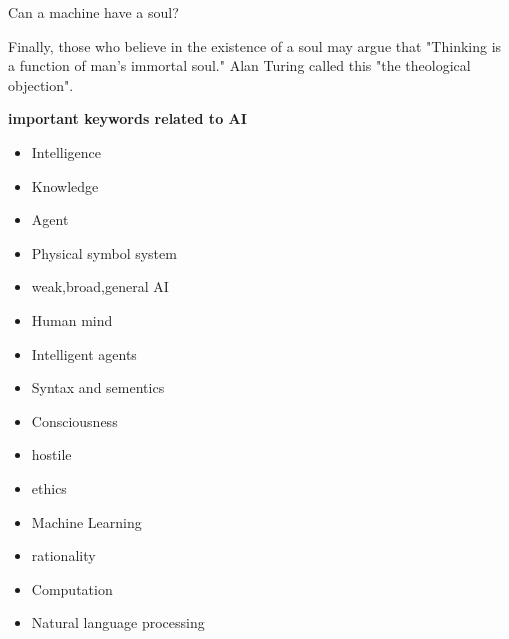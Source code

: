\documentclass{article}
\begin{document}
Can a machine have a soul?

Finally, those who believe in the existence of a soul may argue that "Thinking is a function of man's immortal soul." Alan Turing called this "the theological objection".





\textbf{important keywords related to AI}
\begin{itemize}
\item Intelligence
\item Knowledge
\item Agent
\item Physical symbol system
\item weak,broad,general AI
\item Human mind
\item Intelligent agents
\item Syntax and sementics
\item Consciousness
\item hostile
\item ethics
\item Machine Learning
\item rationality
\item Computation
\item Natural language processing










\end{itemize}






 
\end{document}
